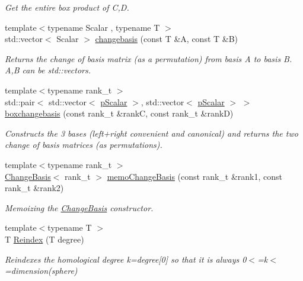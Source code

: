 \begin{DoxyCompactItemize}
\begin{DoxyCompactList}\small\item\em Get the entire box product of C,D. \end{DoxyCompactList}\item 
{\footnotesize template$<$typename Scalar , typename T $>$ }\\std\+::vector$<$ Scalar $>$ \hyperlink{namespaceMackey_acfe96d099f378714f3383db219c525ec}{changebasis} (const T \&A, const T \&B)
\begin{DoxyCompactList}\small\item\em Returns the change of basis matrix (as a permutation) from basis A to basis B. A,B can be std\+::vector\textquotesingle{}s. \end{DoxyCompactList}\item 
{\footnotesize template$<$typename rank\+\_\+t $>$ }\\std\+::pair$<$ std\+::vector$<$ \hyperlink{namespaceMackey_a4f147e328c520f568f5d3adf1c75f514}{p\+Scalar} $>$, std\+::vector$<$ \hyperlink{namespaceMackey_a4f147e328c520f568f5d3adf1c75f514}{p\+Scalar} $>$ $>$ \hyperlink{namespaceMackey_a90ea60504ffb74da3a53875368225f8f}{boxchangebasis} (const rank\+\_\+t \&rankC, const rank\+\_\+t \&rankD)
\begin{DoxyCompactList}\small\item\em Constructs the 3 bases (left+right convenient and canonical) and returns the two change of basis matrices (as permutations). \end{DoxyCompactList}\item 
{\footnotesize template$<$typename rank\+\_\+t $>$ }\\\hyperlink{classMackey_1_1ChangeBasis}{Change\+Basis}$<$ rank\+\_\+t $>$ \hyperlink{namespaceMackey_a70952d513d08b47bc282441a3e9d732c}{memo\+Change\+Basis} (const rank\+\_\+t \&rank1, const rank\+\_\+t \&rank2)
\begin{DoxyCompactList}\small\item\em Memoizing the \hyperlink{classMackey_1_1ChangeBasis}{Change\+Basis} constructor. \end{DoxyCompactList}\item 
{\footnotesize template$<$typename T $>$ }\\T \hyperlink{namespaceMackey_a7da73ade3ee83c4ffd614e79242d7c04}{Reindex} (T degree)
\begin{DoxyCompactList}\small\item\em Reindexes the homological degree k=degree\mbox{[}0\mbox{]} so that it is always 0$<$=k$<$=dimension(sphere) \end{DoxyCompactList}\item 

\end{DoxyCompactItemize}
